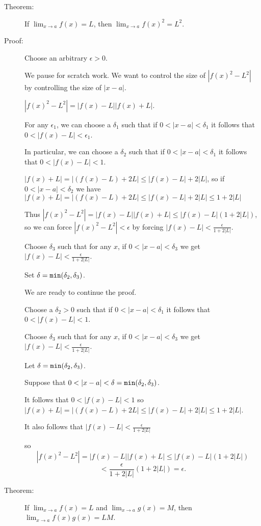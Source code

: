 \documentclass[12pt]{article}
\begin{document}
\begin{description}

\item[Theorem:]  If $\lim_{x \rightarrow a}f(x) = L$, then $\lim_{x \rightarrow a}f(x)^2 = L^2$.

\item[Proof:]  Choose an arbitrary $\epsilon>0$.

We pause for scratch work.  We want to control the size of $|f(x)^2 - L^2|$ by controlling the size of $|x-a|$.

$|f(x)^2 - L^2| = |f(x)-L||f(x)+L|$.

For any $\epsilon_1$, we can choose a $\delta_1$ such that if $0<|x-a|<\delta_1$ it follows that $0<|f(x)-L|<\epsilon_1$.

In particular, we can choose a $\delta_2$ such that if $0<|x-a|<\delta_1$ it follows that $0<|f(x)-L|<1$.

$|f(x)+L| = |(f(x)-L)+2L| \leq |f(x)-L| + 2|L|$, so if $0<|x-a|<\delta_2$ we have $|f(x)+L| = |(f(x)-L)+2L| \leq |f(x)-L| + 2|L|\leq 1+2|L|$

Thus $|f(x)^2 - L^2| = |f(x)-L||f(x)+L| \leq |f(x)-L|(1+2|L|)$, so we can force $|f(x)^2 - L^2|<\epsilon$ by
forcing $|f(x)-L|< \frac{\epsilon}{1+2|L|}$.

Choose $\delta_3$ such that for any $x$, if $0<|x-a|<\delta_3$ we get $|f(x)-L|< \frac{\epsilon}{1+2|L|}$.

Set $\delta = {\tt min}(\delta_2,\delta_3)$.

We are ready to continue the proof.

Choose a $\delta_2>0$ such that if $0<|x-a|<\delta_1$ it follows that $0<|f(x)-L|<1$.

Choose $\delta_3$ such that for any $x$, if $0<|x-a|<\delta_3$ we get $|f(x)-L|< \frac{\epsilon}{1+2|L|}$.

Let $\delta={\tt min}(\delta_2,\delta_3)$.

Suppose that $0<|x-a|<\delta={\tt min}(\delta_2,\delta_3)$.

It follows that $0<|f(x)-L|<1$ so $|f(x)+L| = |(f(x)-L)+2L| \leq |f(x)-L| + 2|L|\leq 1+2|L|$.

It also follows that $|f(x)-L|< \frac{\epsilon}{1+2|L|}$

so $$|f(x)^2 - L^2| = |f(x)-L||f(x)+L| \leq |f(x)-L|(1+2|L|)$$ $$< \frac{\epsilon}{1+2|L|}(1+2|L|) = \epsilon.$$

\item[Theorem:]  If $\lim_{x \rightarrow a}f(x) = L$ and $\lim_{x \rightarrow a}g(x) = M$, then 
$\lim_{x \rightarrow a}f(x)g(x) = LM$.


\end{description}
\end{document}

